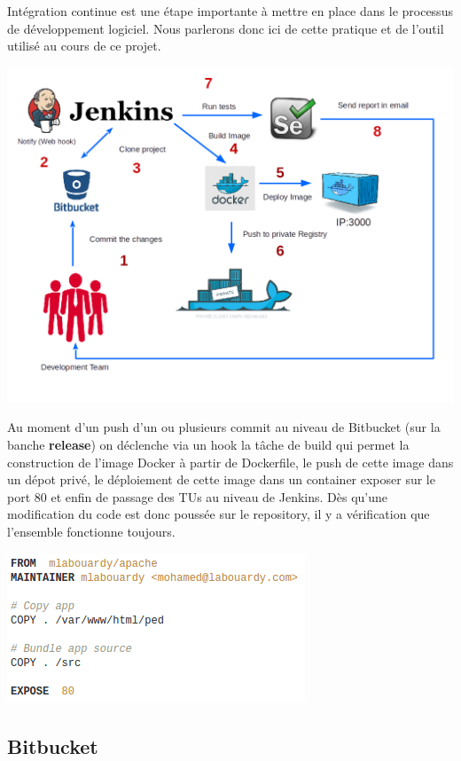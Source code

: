 \documentclass [a4paper,11pt]{article}
\begin{document}
Intégration continue est une étape importante à mettre en place dans le processus de développement logiciel. Nous parlerons donc ici de cette pratique et de l'outil utilisé au cours de ce projet.

\begin{center}
\includegraphics[scale=0.5]{img/ci.png}
\end{center}

Au moment d’un push d’un ou plusieurs commit au niveau de Bitbucket (sur la banche \textbf{release}) on déclenche via un hook la tâche de build qui permet la construction de l'image Docker à partir de Dockerfile, le push de cette image dans un dépot privé, le déploiement de cette image dans un container exposer sur le port 80 et enfin de passage des TUs au niveau de Jenkins. Dès qu’une modification du code est donc poussée sur le repository, il y a vérification que l’ensemble fonctionne toujours.

\begin{center}
\includegraphics[scale=0.7]{img/Dockerfile.png}
\end{center}

\subsection{Bitbucket}
\end{document}
